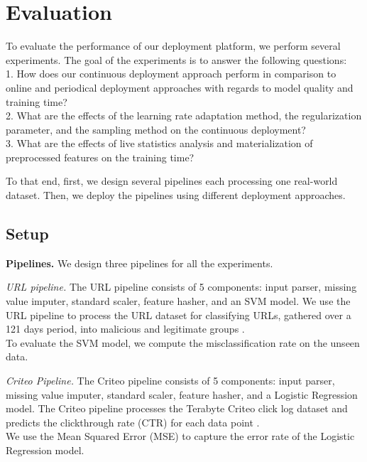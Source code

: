 \section{Evaluation} \label{evaluation} 
To evaluate the performance of our deployment platform, we perform several experiments.
The goal of the experiments is to answer the following questions:\\
1. How does our continuous deployment approach perform in comparison to online and periodical deployment approaches with regards to model quality and training time? \\
2. What are the effects of the learning rate adaptation method, the regularization parameter, and the sampling method on the continuous deployment? \\
3. What are the effects of live statistics analysis and materialization of preprocessed features on the training time?

To that end, first, we design several pipelines each processing one real-world dataset.
Then, we deploy the pipelines using different deployment approaches.

\subsection{Setup}\label{subsec:setup}
\textbf{Pipelines.}
We design three pipelines for all the experiments.

\textit{URL pipeline. } The URL pipeline consists of 5 components: input parser, missing value imputer, standard scaler, feature hasher, and an SVM model.
We use the URL pipeline to process the URL dataset for classifying URLs, gathered over a 121 days period, into malicious and legitimate groups \cite{ma2009identifying}.\\
To evaluate the SVM model, we compute the misclassification rate on the unseen data.

\textit{Criteo Pipeline.} 
The Criteo pipeline consists of 5 components: input parser, missing value imputer, standard scaler, feature hasher, and a Logistic Regression model.
The Criteo pipeline processes the Terabyte Criteo click log dataset and predicts the clickthrough rate (CTR) for each data point \cite{criteo-log}.\\
We use the Mean Squared Error (MSE) to capture the error rate of the Logistic Regression model.

